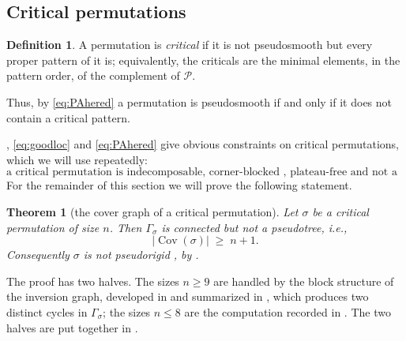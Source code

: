 \documentclass[12pt]{article}
\def\xspace{ }%
\newtheorem{theorem}{Theorem}[section]
\theoremstyle{definition}
\newtheorem{definition}[definition]{Definition}
\newcommand{\prig}{pseudorigid\xspace}
\newcommand{\psm}{pseudosmooth\xspace}
\newcommand{\cb}{corner-blocked\xspace}
\newcommand{\PA}{\mathcal{P}}          %
\newcommand{\Cov}{\operatorname{Cov}}  %
\newcommand{\cgr}{\Gamma}                 %
\begin{document}
\subsection{Critical permutations}\label{ssec:crit}

\begin{definition}\label{def:crit}
A permutation is \emph{critical} if it is not \psm but every proper
pattern of it is; equivalently, the criticals are the minimal elements,
in the pattern order, of the complement of $\PA$.
\end{definition}

\noindent
Thus, by \eqref{eq:PAhered} a permutation is \psm if and only if it does not contain a critical pattern.

 , \eqref{eq:goodloc} and \eqref{eq:PAhered} give obvious constraints on critical permutations, which we
will use repeatedly:
\begin{equation}\label{eq:critbasic}
\text{a critical permutation is indecomposable, \cb, plateau-free and not a tower.}
\end{equation}
For the remainder of this section we will prove the following statement.

\begin{theorem}[the cover graph of a critical permutation]\label{thm:covercount}
Let $\sigma$ be a critical permutation of size $n$. Then $\cgr_\sigma$ is
connected but not a pseudotree, i.e.,
\begin{equation}\label{eq:covercount}
   |\Cov(\sigma)| \;\ge\; n+1.
\end{equation}
Consequently $\sigma$ is not \prig, by .
\end{theorem}

The proof has two halves. The sizes
$n \ge 9$ are handled by the block structure of the inversion graph,
developed in  and summarized in
, which produces two distinct cycles in $\cgr_\sigma$;
the sizes $n \le 8$ are the computation recorded in .
The two halves are put together in .
\end{document}
